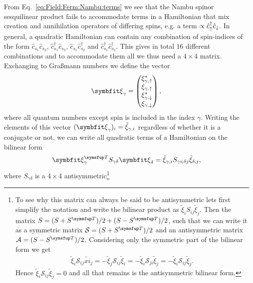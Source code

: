 From Eq.~\eqref{eq:Field:Ferm:Nambu:terms} we see that the Nambu spinor sesquilinear product fails to accommodate terms in a Hamiltonian that mix creation and annihilation
operators of differing spins, e.g. a term $\propto \hat{c}_\uparrow^\dagger\hat{c}_\downarrow$. 
In general, a quadratic Hamiltonian can contain any combination of spin-indices of the form $\hat{c}_{s_1}\hat{c}_{s_2}$, $\hat{c}_{s_1}^\dagger\hat{c}_{s_2}$,
$\hat{c}_{s_1}\hat{c}_{s_2}^\dagger$ and
$\hat{c}_{s_1}^\dagger\hat{c}_{s_2}^\dagger$. This gives in total $16$ different combinations and to accommodate them all we thus need a $4\times4$ matrix.
Exchanging to Gra\ss mann numbers we define the vector
\begin{equation}
    \label{eq:Field:Ferm:ExNambu:spinor}
    \v{\xi}_\gamma = 
    \begin{pmatrix}
        \xi_{\gamma,\up}^\ast\\
        \xi_{\gamma,\up}\\
        \xi_{\gamma,\dn}^\ast\\
        \xi_{\gamma,\dn}
    \end{pmatrix},
\end{equation}
where all quantum numbers except spin is included in the index $\gamma$.
Writing the elements of this vector $(\v{\xi}_\gamma)_i = \tilde{\xi}_{\gamma,i}$ regardless of whether it is a conjugate or not, 
we can write all quadratic terms of a Hamiltonian on the bilinear form
\begin{equation}
    \label{eq:Field:Ferm:ExNambu:bilinear}
    \v{\xi}_\gamma^\trans S_{\gamma\delta}\v{\xi}_\delta = \tilde{\xi}_{\gamma,i}S_{\gamma i; \delta j}\tilde{\xi}_{\delta, j},
\end{equation}
where $S_{\gamma\delta}$ is a $4\times4$ antisymmetric\footnote{To see why this matrix can always be said to be antisymmetric lets first simplify the notation
and write the bilinear product as $\tilde{\xi}_iS_{ij}\tilde{\xi}_j$. Then the matrix $S = (S + S^\trans)/2 + (S - S^\trans)/2$, such that we can write it as a
symmetric matrix ${\mathcal{S} = (S+S^\trans)/2}$ and an antisymmetric matrix $\mathcal{A} = (S-S^\trans)/2$. Considering only the symmetric part of the bilinear
form we get
\begin{equation*}
    \begin{split}
        \tilde{\xi}_i\mathcal{S}_{ij}\tilde{xi}_j = -\tilde{\xi}_j\mathcal{S}_{ij}\tilde{\xi}_i = -\tilde{\xi}_i\mathcal{S}_{ji}\tilde{\xi}_j = -\tilde{\xi}_i\mathcal{S}_{ij}\tilde{\xi}_j.
    \end{split}
\end{equation*}
Hence $\tilde{\xi}_i\mathcal{S}_{ij}\tilde{\xi}_j = 0$ and all that remains is the antisymmetric bilinear form.}
